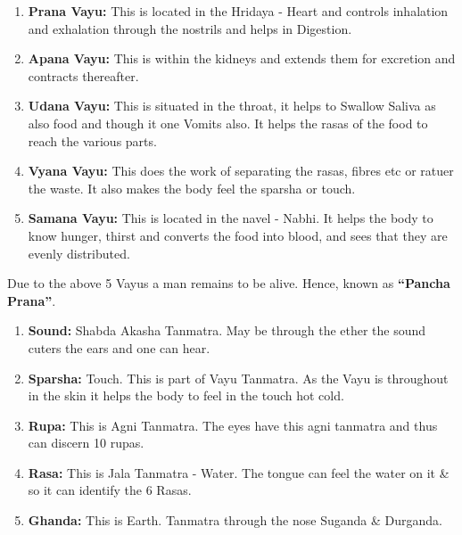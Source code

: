 \begin{enumerate}
\item \textbf{Prana Vayu:} This is located in the Hridaya - Heart and controls inhalation and exhalation through the nostrils and helps in Digestion.

 \item \textbf{Apana Vayu:} This is within the kidneys and extends them for excretion and contracts thereafter.

 \item \textbf{Udana Vayu:} This is situated in the throat, it helps to Swallow Saliva as also food and though it one Vomits also. It helps the rasas of the food to reach the various parts.

 \item \textbf{Vyana Vayu:} This does the work of separating the rasas, fibres etc or ratuer the waste. It also makes the body feel the sparsha or touch.

 \item \textbf{Samana Vayu:} This is located in the navel - Nabhi. It helps the body to know hunger, thirst and converts the food into blood, and sees that they are evenly distributed.

\end{enumerate}

Due to the above 5 Vayus a man remains to be alive. Hence, known as \textbf{“Pancha Prana”}.

\begin{enumerate}
\item \textbf{Sound:} Shabda Akasha Tanmatra. May be through the ether the sound cuters the ears and one can hear.

 \item \textbf{Sparsha:} Touch. This is part of Vayu Tanmatra. As the Vayu is throughout in the skin it helps the body to feel in the touch hot cold.

 \item \textbf{Rupa:} This is Agni Tanmatra. The eyes have this agni tanmatra and thus can discern 10 rupas.

 \item \textbf{Rasa:} This is Jala Tanmatra - Water. The tongue can feel the water on it \& so it can identify the 6 Rasas.

 \item \textbf{Ghanda:} This is Earth. Tanmatra through the nose Suganda \& Durganda.

\end{enumerate}

